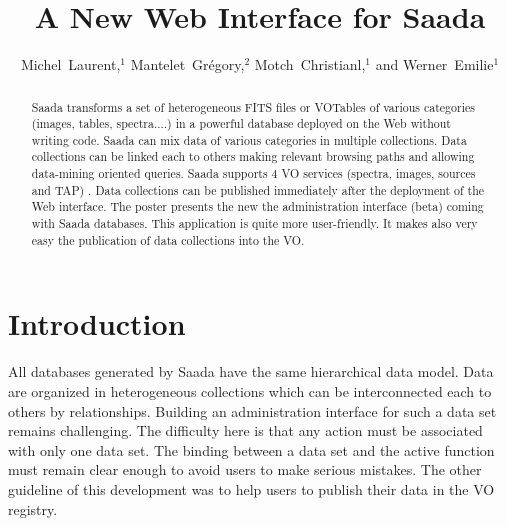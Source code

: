 
\resetcounters


\title{A New Web Interface for Saada}
\author{Michel~Laurent,$^1$ Mantelet~Gr\'egory,$^2$ Motch~Christianl,$^1$ and Werner~Emilie$^1$
}


\begin{abstract}
Saada transforms a set of heterogeneous FITS files or VOTables of various categories (images, tables, spectra....) in a powerful database deployed on the Web without writing code. Saada can mix data of various categories in multiple collections. Data collections can be linked each to others making relevant browsing paths and allowing data-mining oriented queries. Saada supports 4 VO services (spectra, images, sources and TAP) . Data collections can be published immediately after the deployment of the Web interface. The poster presents the new the administration interface (beta) coming with Saada databases. This application is quite more user-friendly. It makes also very easy the publication of data collections into the VO.
\end{abstract}

\section{Introduction}
All databases generated by Saada \citep{SAADA} have the same hierarchical data model. Data are organized in heterogeneous collections which can be interconnected each to others by relationships. Building an administration interface for such a data set remains challenging. The difficulty here is that any action must be associated with only one data set. The binding between a data set and the active function must remain clear enough to avoid users to make serious mistakes. The other guideline of this development was to help users to publish their data in the VO registry.

